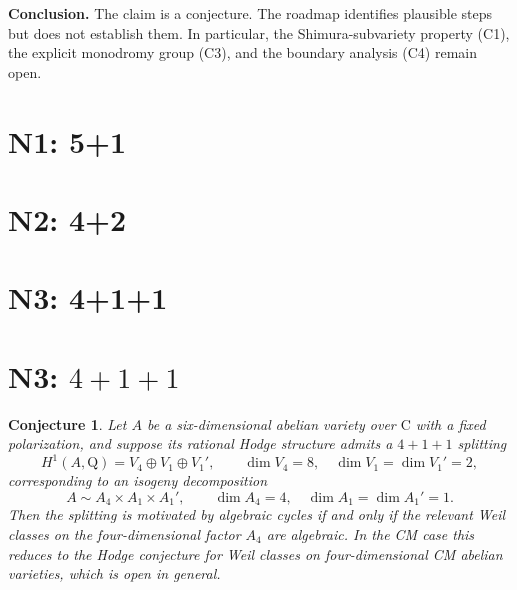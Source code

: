 \documentclass{article}
\newcommand{\mathbb}[1]{\mathrm{#1}}
\newtheorem{conjecture}{Conjecture}
\begin{document}
\medskip
\noindent\textbf{Conclusion.}
The claim is a conjecture. The roadmap identifies plausible steps but does not establish them. In particular, the Shimura-subvariety property (C1), the explicit monodromy group (C3), and the boundary analysis (C4) remain open.

\section{N1: 5+1}

\section{N2: 4+2}

\section{N3: 4+1+1}
\section*{N3: \(4+1+1\)}

\begin{conjecture}
Let \(A\) be a six-dimensional abelian variety over \(\mathbb C\) with a fixed polarization, and suppose its rational Hodge structure admits a \(4+1+1\) splitting
\[
H^1(A,\mathbb Q)=V_4\oplus V_1\oplus V_1',
\qquad
\dim V_4=8,\quad \dim V_1=\dim V_1'=2,
\]
corresponding to an isogeny decomposition
\[
A\sim A_4\times A_1\times A_1',
\qquad
\dim A_4=4,\quad \dim A_1=\dim A_1'=1.
\]
Then the splitting is motivated by algebraic cycles if and only if the relevant Weil classes on the four-dimensional factor \(A_4\) are algebraic. In the CM case this reduces to the Hodge conjecture for Weil classes on four-dimensional CM abelian varieties, which is open in general.
\end{conjecture}
\end{document}
